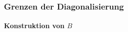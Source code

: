 \begin{frame}
	\frametitle{Grenzen der Diagonalisierung}
	\framesubtitle{Konstruktion von $B$}
	\begin{columns}
	

\end{columns}
\end{frame}
